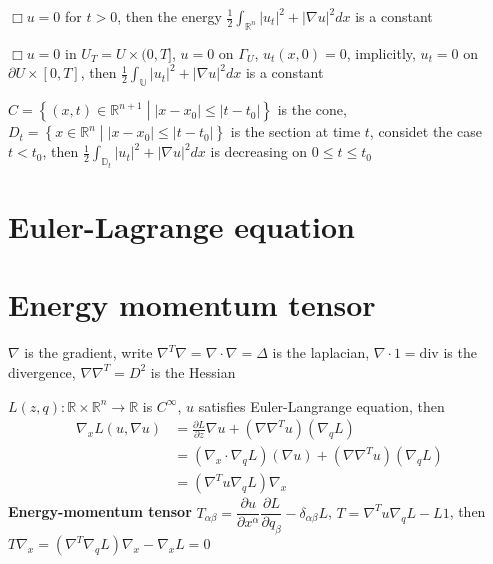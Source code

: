 \documentclass[main]{subfiles}
\begin{document}
\begin{theorem}
$\Box u=0$ for $t>0$, then the energy $\displaystyle\frac{1}{2}\int_{\mathbb R^n}|u_t|^2+|\nabla u|^2dx$ is a constant
\end{theorem}

\begin{theorem}
$\Box u=0$ in $U_T=U\times(0,T]$, $u=0$ on $\Gamma_U$, $u_t(x,0)=0$, implicitly, $u_t=0$ on $\partial U\times[0,T]$, then $\displaystyle\frac{1}{2}\int_{\mathbb U}|u_t|^2+|\nabla u|^2dx$ is a constant
\end{theorem}

\begin{theorem}
$C=\left\{(x,t)\in\mathbb R^{n+1}\middle||x-x_0|\leq|t-t_0|\right\}$ is the cone, $D_t=\left\{x\in\mathbb R^n\middle||x-x_0|\leq|t-t_0|\right\}$ is the section at time $t$, considet the case $t<t_0$, then $\displaystyle\frac{1}{2}\int_{\mathbb D_t}|u_t|^2+|\nabla u|^2dx$ is decreasing on $0\leq t\leq t_0$
\end{theorem}



\section{Euler-Lagrange equation}





\section{Energy momentum tensor}


\begin{definition}
$\nabla$ is the gradient, write $\nabla^T\nabla=\nabla\cdot\nabla=\Delta$ is the laplacian, $\nabla\cdot1=\mathrm{div}$ is the divergence, $\nabla\nabla^T=D^2$ is the Hessian
\end{definition}

\begin{definition}
$L(z,q):\mathbb R\times \mathbb R^n\to\mathbb R$ is $C^\infty$, $u$ satisfies Euler-Langrange equation, then
\begin{align*}
\nabla_xL(u,\nabla u)&=\frac{\partial L}{\partial z}\nabla u+(\nabla\nabla^Tu)(\nabla_qL) \\
&=(\nabla_x\cdot\nabla_qL)(\nabla u)+(\nabla\nabla^Tu)(\nabla_qL) \\
&=(\nabla^Tu\nabla_qL)\nabla_x
\end{align*}
\textbf{Energy-momentum tensor} $T_{\alpha\beta}=\dfrac{\partial u}{\partial x^\alpha}\dfrac{\partial L}{\partial q_\beta}-\delta_{\alpha\beta}L$, $T=\nabla^Tu\nabla_qL-L1$, then $T\nabla_x=(\nabla^T\nabla_qL)\nabla_x-\nabla_xL=0$
\end{definition}
\end{document}
